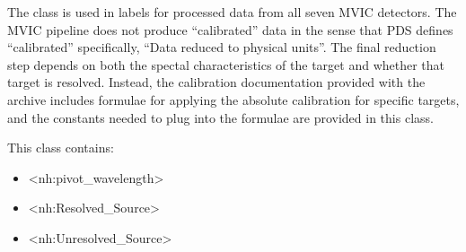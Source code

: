 \documentclass[letterpaper,10pt,english]{sphinxmanual}
\begin{document}
\sphinxAtStartPar
The  class is used in labels for processed
data from all seven MVIC detectors. The MVIC pipeline does not produce “calibrated”
data in the sense that PDS defines “calibrated” \sphinxhyphen{} specifically, “Data reduced to
physical units”. The final reduction step depends on both the spectal characteristics
of the target and whether that target is resolved. Instead, the calibration
documentation provided with the archive includes formulae for applying the absolute
calibration for specific targets, and the constants needed to plug into the
formulae are provided in this class.

\sphinxAtStartPar
This class contains:
\begin{itemize}
\item {} 
\sphinxAtStartPar
\textless{}nh:pivot\_wavelength\textgreater{}

\item {} 
\sphinxAtStartPar
\textless{}nh:Resolved\_Source\textgreater{}

\item {} 
\sphinxAtStartPar
\textless{}nh:Unresolved\_Source\textgreater{}

\end{itemize}
\end{document}
